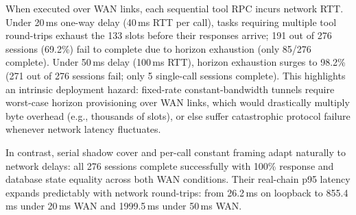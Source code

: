 When executed over WAN links, each sequential tool RPC incurs network RTT. Under 20\,ms one-way delay (40\,ms RTT per call), tasks requiring multiple tool round-trips exhaust the 133 slots before their responses arrive; 191 out of 276 sessions (69.2\%) fail to complete due to horizon exhaustion (only 85/276 complete). Under 50\,ms delay (100\,ms RTT), horizon exhaustion surges to 98.2\% (271 out of 276 sessions fail; only 5 single-call sessions complete). This highlights an intrinsic deployment hazard: fixed-rate constant-bandwidth tunnels require worst-case horizon provisioning over WAN links, which would drastically multiply byte overhead (e.g., thousands of slots), or else suffer catastrophic protocol failure whenever network latency fluctuates.

In contrast, serial shadow cover and per-call constant framing adapt naturally to network delays: all 276 sessions complete successfully with 100\% response and database state equality across both WAN conditions. Their real-chain p95 latency expands predictably with network round-trips: from 26.2\,ms on loopback to 855.4\,ms under 20\,ms WAN and 1999.5\,ms under 50\,ms WAN.


\clearpage

